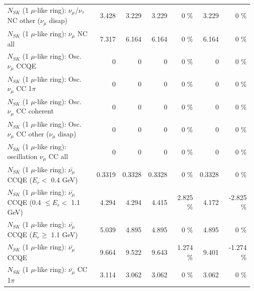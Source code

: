 \begin{table}
\begin{tabular}{| l | r | r | r  r | r  r |}
   $N_{SK}$ (1 $\mu$-like ring): $\nu_\mu$/$\nu_\tau$ NC other ($\nu_\mu$ disap) &           3.428 &           3.229 &           3.229 &        0 \%  &           3.229 &        0 \%  \\ 
                                $N_{SK}$ (1 $\mu$-like ring): $\nu_{\mu}$ NC all &           7.317 &           6.164 &           6.164 &        0 \%  &           6.164 &        0 \%  \\ 
\hline
\hline
                               $N_{SK}$ (1 $\mu$-like ring): Osc. $\nu_\mu$ CCQE &               0 &               0 &               0 &        0 \%  &               0 &        0 \%  \\ 
                          $N_{SK}$ (1 $\mu$-like ring): Osc. $\nu_\mu$ CC 1$\pi$ &               0 &               0 &               0 &        0 \%  &               0 &        0 \%  \\ 
                        $N_{SK}$ (1 $\mu$-like ring): Osc. $\nu_\mu$ CC coherent &               0 &               0 &               0 &        0 \%  &               0 &        0 \%  \\ 
         $N_{SK}$ (1 $\mu$-like ring): Osc. $\nu_\mu$ CC other ($\nu_\mu$ disap) &               0 &               0 &               0 &        0 \%  &               0 &        0 \%  \\ 
                      $N_{SK}$ (1 $\mu$-like ring): oscillation $\nu_\mu$ CC all &               0 &               0 &               0 &        0 \%  &               0 &        0 \%  \\ 
\hline
\hline
          $N_{SK}$ (1 $\mu$-like ring): $\bar{\nu_\mu}$ CCQE ($E_{r} <$ 0.4 GeV) &          0.3319 &          0.3328 &          0.3328 &        0 \%  &          0.3328 &        0 \%  \\ 
 $N_{SK}$ (1 $\mu$-like ring): $\bar{\nu_\mu}$ CCQE (0.4 $\leq E_{r} <$ 1.1 GeV) &           4.294 &           4.294 &           4.415 &    2.825 \%  &           4.172 &   -2.825 \%  \\ 
       $N_{SK}$ (1 $\mu$-like ring): $\bar{\nu_\mu}$ CCQE ($E_{r} \geq$ 1.1 GeV) &           5.039 &           4.895 &           4.895 &        0 \%  &           4.895 &        0 \%  \\ 
\hline
                              $N_{SK}$ (1 $\mu$-like ring): $\bar{\nu_\mu}$ CCQE &           9.664 &           9.522 &           9.643 &    1.274 \%  &           9.401 &   -1.274 \%  \\ 
                         $N_{SK}$ (1 $\mu$-like ring): $\bar{\nu_\mu}$ CC 1$\pi$ &           3.114 &           3.062 &           3.062 &        0 \%  &           3.062 &        0 \%  \\ 

\end{tabular}
\end{table}
